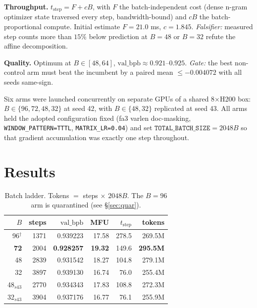 \documentclass{article}
\newcommand{\valbpb}{\mathrm{val\_bpb}}
\begin{document}
\textbf{Throughput.} $t_{\mathrm{step}} = F + cB$, with $F$ the batch-independent cost (dense n-gram optimizer state traversed every step, bandwidth-bound) and $cB$ the batch-proportional compute. Initial estimate $F = 21.0$ ms, $c = 1.845$. \emph{Falsifier:} measured step counts more than $15\%$ below prediction at $B{=}48$ or $B{=}32$ refute the affine decomposition.

\textbf{Quality.} Optimum at $B \in [48,64]$, $\valbpb \approx 0.921$--$0.925$. \emph{Gate:} the best non-control arm must beat the incumbent by a paired mean $\le -0.004072$ with all seeds same-sign.

Six arms were launched concurrently on separate GPUs of a shared 8$\times$H200 box: $B \in \{96,72,48,32\}$ at seed 42, with $B \in \{48,32\}$ replicated at seed 43. All arms held the adopted configuration fixed (fa3 varlen doc-masking, \texttt{WINDOW\_PATTERN=TTTL}, \texttt{MATRIX\_LR=0.04}) and set $\texttt{TOTAL\_BATCH\_SIZE} = 2048B$ so that gradient accumulation was exactly one step throughout.

\section{Results}

\begin{table}[t]
\caption{Batch ladder. Tokens $=$ steps $\times$ $2048B$. The $B{=}96$ arm is quarantined (see \S\ref{sec:quar}).}
\label{tab:ladder}
\vskip 0.1in
\begin{center}\begin{small}
\begin{tabular}{rrrrrr}
\toprule
$B$ & steps & $\valbpb$ & MFU & $t_{\mathrm{step}}$ & tokens \\
\midrule
96$^\dagger$ & 1371 & 0.939223 & 17.58 & 278.5 & 269.5M \\
\textbf{72} & 2004 & \textbf{0.928257} & \textbf{19.32} & 149.6 & \textbf{295.5M} \\
48 & 2839 & 0.931542 & 18.27 & 104.8 & 279.1M \\
32 & 3897 & 0.939130 & 16.74 & 76.0 & 255.4M \\
\midrule
48$_{s43}$ & 2770 & 0.934343 & 17.83 & 108.8 & 272.3M \\
32$_{s43}$ & 3904 & 0.937176 & 16.77 & 76.1 & 255.9M \\
\bottomrule
\end{tabular}
\end{small}\end{center}
\vskip -0.1in
\end{table}
\end{document}
